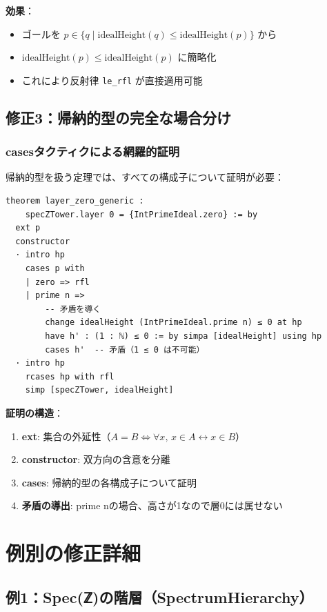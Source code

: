 \documentclass{ltjsarticle}
\begin{document}
\textbf{効果}：
\begin{itemize}
\item ゴールを $p \in \{q \mid \text{idealHeight}(q) \le \text{idealHeight}(p)\}$ から
\item $\text{idealHeight}(p) \le \text{idealHeight}(p)$ に簡略化
\item これにより反射律 \texttt{le\_rfl} が直接適用可能
\end{itemize}

\subsection{修正3：帰納的型の完全な場合分け}

\subsubsection{casesタクティクによる網羅的証明}

帰納的型を扱う定理では、すべての構成子について証明が必要：

\begin{lstlisting}[caption=layer\_zero\_genericの証明]
theorem layer_zero_generic :
    specZTower.layer 0 = {IntPrimeIdeal.zero} := by
  ext p
  constructor
  · intro hp
    cases p with
    | zero => rfl
    | prime n =>
        -- 矛盾を導く
        change idealHeight (IntPrimeIdeal.prime n) ≤ 0 at hp
        have h' : (1 : ℕ) ≤ 0 := by simpa [idealHeight] using hp
        cases h'  -- 矛盾（1 ≤ 0 は不可能）
  · intro hp
    rcases hp with rfl
    simp [specZTower, idealHeight]
\end{lstlisting}

\textbf{証明の構造}：
\begin{enumerate}
\item \textbf{ext}: 集合の外延性（$A = B \iff \forall x,\, x \in A \leftrightarrow x \in B$）
\item \textbf{constructor}: 双方向の含意を分離
\item \textbf{cases}: 帰納的型の各構成子について証明
\item \textbf{矛盾の導出}: prime nの場合、高さが1なので層0には属せない
\end{enumerate}

\section{例別の修正詳細}

\subsection{例1：Spec(ℤ)の階層（SpectrumHierarchy）}
\end{document}
